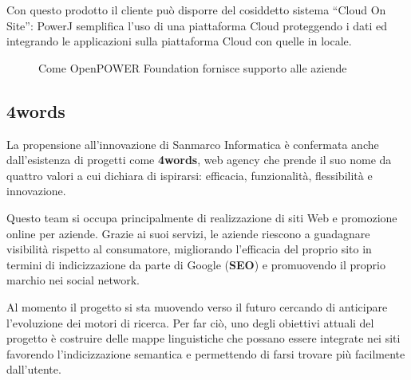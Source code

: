 Con questo prodotto il cliente può disporre del cosiddetto sistema ``Cloud On
Site'': PowerJ semplifica l'uso di una piattaforma Cloud proteggendo i dati ed
integrando le applicazioni sulla piattaforma Cloud con quelle in locale.


\begin{figure}%
  \noindent{}%
  \caption{Come OpenPOWER Foundation fornisce supporto alle aziende}%
  \label{fig:open-power}%
\end{figure}

\subsection{4words} \mbox{}

La propensione all'innovazione di Sanmarco Informatica è confermata anche
dall'esistenza di progetti come \textbf{4words}, web agency che prende il suo
nome da quattro valori a cui dichiara di ispirarsi: efficacia, funzionalità,
flessibilità e innovazione.

Questo team si occupa principalmente di realizzazione di siti Web e promozione
online per aziende. Grazie ai suoi servizi, le aziende riescono a guadagnare
visibilità rispetto al consumatore, migliorando l'efficacia del proprio sito in
termini di indicizzazione da parte di Google (\textbf{SEO}) e promuovendo il
proprio marchio nei social network.

Al momento il progetto si sta muovendo verso il futuro cercando di anticipare
l'evoluzione dei motori di ricerca. Per far ciò, uno degli obiettivi attuali
del progetto è costruire delle mappe linguistiche che possano essere integrate
nei siti favorendo l'indicizzazione semantica e permettendo di farsi trovare
più facilmente dall'utente.

